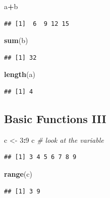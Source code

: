 \documentclass[
]{book}
\newenvironment{Shaded}{\begin{snugshade}}{\end{snugshade}}
\newcommand{\CommentTok}[1]{\textcolor[rgb]{0.56,0.35,0.01}{\textit{#1}}}
\newcommand{\DecValTok}[1]{\textcolor[rgb]{0.00,0.00,0.81}{#1}}
\newcommand{\FunctionTok}[1]{\textcolor[rgb]{0.13,0.29,0.53}{\textbf{#1}}}
\newcommand{\NormalTok}[1]{#1}
\newcommand{\OtherTok}[1]{\textcolor[rgb]{0.56,0.35,0.01}{#1}}
\newcommand{\SpecialCharTok}[1]{\textcolor[rgb]{0.81,0.36,0.00}{\textbf{#1}}}
\begin{document}
\begin{Shaded}
\begin{Highlighting}[]
\NormalTok{a}\SpecialCharTok{+}\NormalTok{b}
\end{Highlighting}
\end{Shaded}

\begin{verbatim}
## [1]  6  9 12 15
\end{verbatim}

\begin{Shaded}
\begin{Highlighting}[]
\FunctionTok{sum}\NormalTok{(b)}
\end{Highlighting}
\end{Shaded}

\begin{verbatim}
## [1] 32
\end{verbatim}

\begin{Shaded}
\begin{Highlighting}[]
\FunctionTok{length}\NormalTok{(a)}
\end{Highlighting}
\end{Shaded}

\begin{verbatim}
## [1] 4
\end{verbatim}

\subsection{Basic Functions III}\label{basic-functions-iii}

\begin{Shaded}
\begin{Highlighting}[]
\NormalTok{c }\OtherTok{\textless{}{-}} \DecValTok{3}\SpecialCharTok{:}\DecValTok{9}
\NormalTok{c }\CommentTok{\# look at the variable}
\end{Highlighting}
\end{Shaded}

\begin{verbatim}
## [1] 3 4 5 6 7 8 9
\end{verbatim}

\begin{Shaded}
\begin{Highlighting}[]
\FunctionTok{range}\NormalTok{(c)}
\end{Highlighting}
\end{Shaded}

\begin{verbatim}
## [1] 3 9
\end{verbatim}
\end{document}
